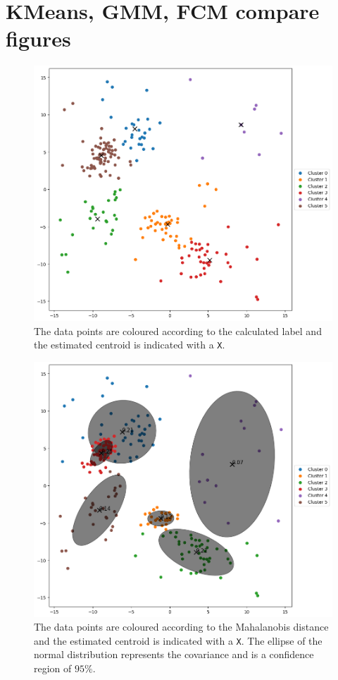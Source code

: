 \chapter{KMeans, GMM, FCM compare figures}

\begin{figure}[h]
    \centering
    \includegraphics[width=0.9\linewidth]{Figures/dati_kmeans.png}
    \caption[example of \gls{kmeans} clustering]{The data points are coloured according to the calculated label and the estimated centroid is indicated with a \texttt{X}.}
    \label{fig:data_kmeans}
\end{figure}
\begin{figure}[h]
    \centering
    \includegraphics[width=0.9\linewidth]{Figures/dati_gmm.png}
    \caption[example of \gls{gmm} clustering]{The data points are coloured according to the Mahalanobis distance and the estimated centroid is indicated with a \texttt{X}. The ellipse of the normal distribution represents the covariance and is a confidence region of $95\%$.}
    \label{fig:data_gmm}
\end{figure}
